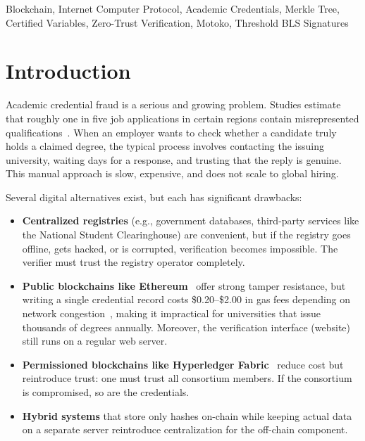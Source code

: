 \documentclass[journal]{IEEEtran}
\begin{document}
\begin{IEEEkeywords}
Blockchain, Internet Computer Protocol, Academic Credentials, Merkle Tree, Certified Variables, Zero-Trust Verification, Motoko, Threshold BLS Signatures
\end{IEEEkeywords}

\section{Introduction}
\label{sec:intro}

Academic credential fraud is a serious and growing problem. Studies estimate that roughly one in five job applications in certain regions contain misrepresented qualifications~\cite{chahal2021credential}. When an employer wants to check whether a candidate truly holds a claimed degree, the typical process involves contacting the issuing university, waiting days for a response, and trusting that the reply is genuine. This manual approach is slow, expensive, and does not scale to global hiring.

Several digital alternatives exist, but each has significant drawbacks:

\begin{itemize}[leftmargin=*]
  \item \textbf{Centralized registries} (e.g., government databases, third-party services like the National Student Clearinghouse) are convenient, but if the registry goes offline, gets hacked, or is corrupted, verification becomes impossible. The verifier must trust the registry operator completely.
  \item \textbf{Public blockchains like Ethereum}~\cite{buterin2014ethereum} offer strong tamper resistance, but writing a single credential record costs \$0.20--\$2.00 in gas fees depending on network congestion~\cite{wood2014ethereum}, making it impractical for universities that issue thousands of degrees annually. Moreover, the verification interface (website) still runs on a regular web server.
  \item \textbf{Permissioned blockchains like Hyperledger Fabric}~\cite{androulaki2018fabric} reduce cost but reintroduce trust: one must trust all consortium members. If the consortium is compromised, so are the credentials.
  \item \textbf{Hybrid systems} that store only hashes on-chain while keeping actual data on a separate server reintroduce centralization for the off-chain component.
\end{itemize}
\end{document}
